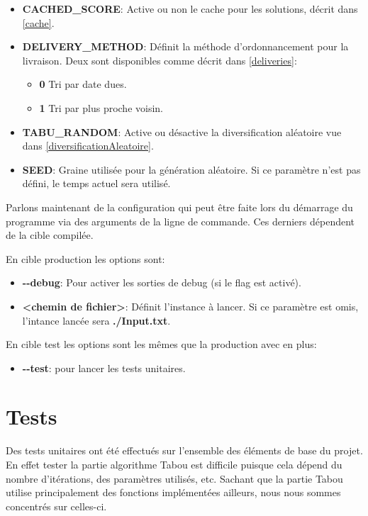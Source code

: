\documentclass[hideweeklyreports]{polytech/polytech}
\begin{document}
\begin{itemize}
					\item \textbf{CACHED\_SCORE}: Active ou non le cache pour les solutions, décrit dans \autoref{cache}.
					\item \textbf{DELIVERY\_METHOD}: Définit la méthode d'ordonnancement pour la livraison. Deux sont disponibles comme décrit dans \autoref{deliveries}:
					\begin{itemize}
						\item \textbf{0} Tri par date dues.
						\item \textbf{1} Tri par plus proche voisin.
					\end{itemize}
					\item \textbf{TABU\_RANDOM}: Active ou désactive la diversification aléatoire vue dans \autoref{diversificationAleatoire}.
					\item \textbf{SEED}: Graine utilisée pour la génération aléatoire. Si ce paramètre n'est pas défini, le temps actuel sera utilisé.
				\end{itemize}
				
				Parlons maintenant de la configuration qui peut être faite lors du démarrage du programme via des arguments de la ligne de commande. Ces derniers dépendent de la cible compilée.
				
				En cible production les options sont:
				\begin{itemize}
					\item \textbf{-{}-debug}: Pour activer les sorties de debug (si le flag est activé).
					\item \textbf{<chemin de fichier>}: Définit l'instance à lancer. Si ce paramètre est omis, l'intance lancée sera \textbf{./Input.txt}.
				\end{itemize}
				
				En cible test les options sont les mêmes que la production avec en plus:
				\begin{itemize}
					\item \textbf{-{}-test}: pour lancer les tests unitaires.
				\end{itemize}
		
		\section{\label{unit}Tests}
			Des tests unitaires ont été effectués sur l'ensemble des éléments de base du projet. En effet tester la partie algorithme Tabou est difficile puisque cela dépend du nombre d'itérations, des paramètres utilisés, etc. Sachant que la partie Tabou utilise principalement des fonctions implémentées ailleurs, nous nous sommes concentrés sur celles-ci.
			
\end{document}
